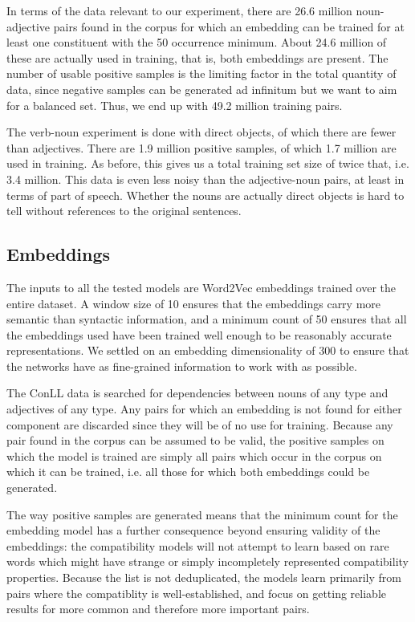 \documentclass[a4paper, 12pt]{article}
\begin{document}
In terms of the data relevant to our experiment, there are 26.6 million noun-adjective pairs found in the corpus for which an embedding can be trained for at least one constituent with the 50 occurrence minimum. About 24.6 million of these are actually used in training, that is, both embeddings are present. The number of usable positive samples is the limiting factor in the total quantity of data, since negative samples can be generated ad infinitum but we want to aim for a balanced set. Thus, we end up with 49.2 million training pairs.

The verb-noun experiment is done with direct objects, of which there are fewer than adjectives. There are 1.9 million positive samples, of which 1.7 million are used in training. As before, this gives us a total training set size of twice that, i.e. 3.4 million. This data is even less noisy than the adjective-noun pairs, at least in terms of part of speech. Whether the nouns are actually direct objects is hard to tell without references to the original sentences.

\subsection{Embeddings}

The inputs to all the tested models are Word2Vec embeddings trained over the entire dataset. A window size of 10 ensures that the embeddings carry more semantic than syntactic information, and a minimum count of 50 ensures that all the embeddings used have been trained well enough to be reasonably accurate representations. We settled on an embedding dimensionality of 300 to ensure that the networks have as fine-grained information to work with as possible.

The ConLL data is searched for dependencies between nouns of any type and adjectives of any type. Any pairs for which an embedding is not found for either component are discarded since they will be of no use for training. Because any pair found in the corpus can be assumed to be valid, the positive samples on which the model is trained are simply all pairs which occur in the corpus on which it can be trained, i.e. all those for which both embeddings could be generated.

The way positive samples are generated means that the minimum count for the embedding model has a further consequence beyond ensuring validity of the embeddings: the compatibility models will not attempt to learn based on rare words which might have strange or simply incompletely represented compatibility properties. Because the list is not deduplicated, the models learn primarily from pairs where the compatiblity is well-established, and focus on getting reliable results for more common and therefore more important pairs.
\end{document}
